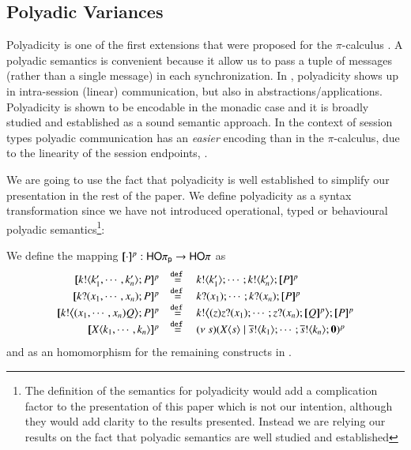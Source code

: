 \subsection{Polyadic Variances}

Polyadicity is one of the first extensions that were proposed
for the $\pi$-calculus \dk{\cite{}}. A polyadic semantics is convenient because it allow us to pass 
a tuple of messages (rather than a single message) in each synchronization.
In \HOp, polyadicity shows up in intra-session (linear) communication, but also in abstractions/applications. 
Polyadicity is shown to be encodable in the monadic case and it is broadly studied
and established as a sound semantic approach.
In the context of session types polyadic communication
has an {\em easier} encoding than in the $\pi$-calculus,
due to the linearity of the session endpoints, \cite{VascoFun}.

We are going to use the fact that polyadicity is well established
to simplify our presentation in the rest of the paper.
We define polyadicity as a syntax transformation since we have not
introduced operational, typed or behavioural polyadic semantics\footnote{
The definition of the semantics for polyadicity would add a complication
factor to the presentation of this paper which is not our intention,
although they would add clarity to the results presented.
Instead we are relying our results on the fact that polyadic semantics are well
studied and established}:

\begin{definition}
We define the mapping $[\!\![\cdot]\!\!]^{p}:\mathsf{HO}\pi_{\mathsf{p}} \to \mathsf{HO}\pi$ as
\[
	\begin{array}{rcl}
			\map{\bout{k}{k'_1, \cdots, k'_n} P}^{p} &\defeq& \bout{k}{k'_1} \cdots ;  \bout{k}{k'_n} \pmap{P}{p}\\
			\map{\binp{k}{x_1, \cdots, x_n} P}^{p} &\defeq& \binp{k}{x_1} \cdots ; \binp{k}{x_n}  \pmap{P}{p} \\
			\map{\bbout{k}{\abs{x_1, \cdots, x_n} Q} P}^{p} &\defeq& \bbout{k}{\abs{z}\binp{z}{x_1} \cdots ; \binp{z}{x_n}\map{Q}^{p}} \map{P}^{p}\\
			\map{\appl{X}{k_1, \cdots, k_n}}^{p}  &\defeq& \newsp{s}{\appl{X}{s} \Par \bout{\dual{s}}{k_1} \cdots ; \bout{\dual{s}}{k_n} \inact}^{p}
	\end{array}
	\]
	and as an homomorphism for the remaining constructs in \pHOp. 
\end{definition}

